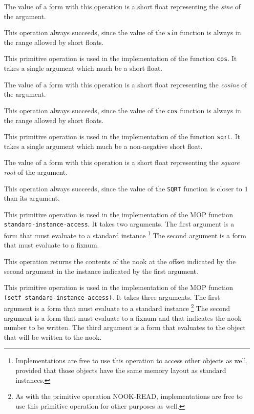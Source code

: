 The value of a form with this operation is a short float representing
the \emph{sine} of the argument.

This operation always succeeds, since the value of the \texttt{sin}
function is always in the range allowed by short floats.

 {}

This primitive operation is used in the implementation of the
\commonlisp{} function \texttt{cos}.  It takes a single argument which
much be a short float.

The value of a form with this operation is a short float representing
the \emph{cosine} of the argument.

This operation always succeeds, since the value of the \texttt{cos}
function is always in the range allowed by short floats.

 {}

This primitive operation is used in the implementation of the
\commonlisp{} function \texttt{sqrt}.  It takes a single argument which
much be a non-negative short float.

The value of a form with this operation is a short float representing
the \emph{square root} of the argument.

This operation always succeeds, since the value of the \texttt{SQRT}
function is closer to $1$ than its argument.

 {}

This primitive operation is used in the implementation of the MOP
function \texttt{standard-instance-access}.  It takes two arguments.
The first argument is a form that must evaluate to a standard
instance%
\footnote{Implementations are free to use this operation to access
  other objects as well, provided that those objects have the same
  memory layout as standard instances.}
The second argument is a form that must evaluate to a fixnum.

This operation returns the contents of the nook at the offset
indicated by the second argument in the instance indicated by the
first argument.

 {}

This primitive operation is used in the implementation of the MOP
function \texttt{(setf standard-instance-access)}.  It takes three
arguments.  The first argument is a form that must evaluate to a
standard instance%
\footnote{As with the primitive operation NOOK-READ, implementations
  are free to use this primitive operation for other purposes as
  well.}
The second argument is a form that must evaluate to a fixnum and that
indicates the nook number to be written.  The third argument is a form
that evaluates to the object that will be written to the nook.

